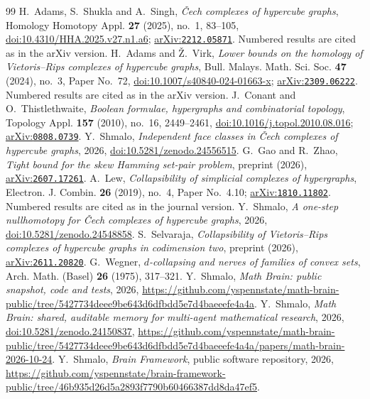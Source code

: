 \documentclass[11pt]{amsart}
\theoremstyle{definition}
\theoremstyle{remark}
\newcommand{\arxiv}[1]{\href{https://arxiv.org/abs/#1}{arXiv:\nolinkurl{#1}}}
\begin{document}
\begin{thebibliography}{99}
 H.~Adams, S.~Shukla and A.~Singh, \emph{\v{C}ech complexes of hypercube graphs}, Homology Homotopy Appl.
\textbf{27} (2025), no.~1, 83--105, \href{https://doi.org/10.4310/HHA.2025.v27.n1.a6}{doi:10.4310/HHA.2025.v27.n1.a6};
\arxiv{2212.05871}. Numbered results are cited as in the arXiv version.
 H.~Adams and \v{Z}.~Virk, \emph{Lower bounds on the homology of Vietoris--Rips complexes of hypercube
graphs}, Bull. Malays. Math. Sci. Soc. \textbf{47} (2024), no.~3, Paper No.~72,
\href{https://doi.org/10.1007/s40840-024-01663-x}{doi:10.1007/s40840-024-01663-x}; \arxiv{2309.06222}. Numbered results
are cited as in the arXiv version.
 J.~Conant and O.~Thistlethwaite, \emph{Boolean formulae, hypergraphs and combinatorial topology},
Topology Appl. \textbf{157} (2010), no.~16, 2449--2461,
\href{https://doi.org/10.1016/j.topol.2010.08.016}{doi:10.1016/j.topol.2010.08.016}; \arxiv{0808.0739}.
 Y.~Shmalo, \emph{Independent face classes in \v{C}ech complexes of hypercube graphs}, 2026,
\href{https://doi.org/10.5281/zenodo.24556515}{doi:10.5281/zenodo.24556515}.
 G.~Gao and R.~Zhao, \emph{Tight bound for the skew Hamming set-pair problem}, preprint (2026),
\arxiv{2607.17261}.
 A.~Lew, \emph{Collapsibility of simplicial complexes of hypergraphs}, Electron. J. Combin. \textbf{26}
(2019), no.~4, Paper No.~4.10; \arxiv{1810.11802}. Numbered results are cited as in the journal version.
 Y.~Shmalo, \emph{A one-step nullhomotopy for \v{C}ech complexes of hypercube graphs}, 2026,
\href{https://doi.org/10.5281/zenodo.24548858}{doi:10.5281/zenodo.24548858}.
 S.~Selvaraja, \emph{Collapsibility of Vietoris--Rips complexes of hypercube graphs in codimension two},
preprint (2026), \arxiv{2611.20820}.
 G.~Wegner, \emph{$d$-collapsing and nerves of families of convex sets}, Arch. Math. (Basel) \textbf{26}
(1975), 317--321.
 Y.~Shmalo, \emph{Math Brain: public snapshot, code and tests}, 2026,
\url{https://github.com/yspennstate/math-brain-public/tree/5427734deee9be643d6dfbdd5e7d4baeeefe4a4a}.
 Y.~Shmalo, \emph{Math Brain: shared, auditable memory for multi-agent mathematical
research}, 2026, \href{https://doi.org/10.5281/zenodo.24150837}{doi:10.5281/zenodo.24150837},
\url{https://github.com/yspennstate/math-brain-public/tree/5427734deee9be643d6dfbdd5e7d4baeeefe4a4a/papers/math-brain-2026-10-24}.
 Y.~Shmalo, \emph{Brain Framework}, public software repository, 2026,
\url{https://github.com/yspennstate/brain-framework-public/tree/46b935d26d5a2893f7790b60466387dd8da47ef5}.
\end{thebibliography}
\end{document}
